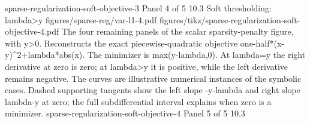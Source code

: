 {sparse-regularization-soft-objective-3}
{Panel 4 of 5}
{10.3}
{Soft thresholding: lambda>y}
{figures/sparse-reg/var-l1-4.pdf}
{figures/tikz/sparse-regularization-soft-objective-4.pdf}
{The four remaining panels of the scalar sparsity-penalty figure, with y>0.}
{Reconstructs the exact piecewise-quadratic objective one-half*(x-y)\textasciicircum{}2+lambda*abs(x). The minimizer is max(y-lambda,0). At lambda=y the right derivative at zero is zero; at lambda>y it is positive, while the left derivative remains negative. The curves are illustrative numerical instances of the symbolic cases. Dashed supporting tangents show the left slope -y-lambda and right slope lambda-y at zero; the full subdifferential interval explains when zero is a minimizer.}
{sparse-regularization-soft-objective-4}
{Panel 5 of 5}
{10.3}
